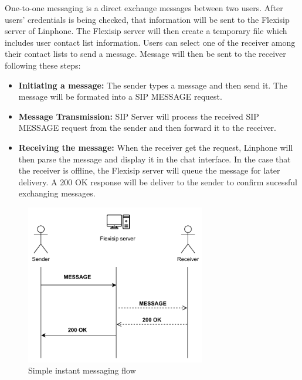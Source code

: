     \noindent One-to-one messaging is a direct exchange messages between two users. 
    After users' credentials is being checked, that information will be sent to the Flexisip server of Linphone. The Flexisip server will then create a temporary file which includes user contact list information.  
    Users can select one of the receiver among their contact lists to send a message. Message will then be sent to the receiver following these steps:

    \begin{itemize}
        \item \textbf {Initiating a message:} The sender types a message and then send it. The message will be formated into a SIP MESSAGE request. 
        \item \textbf {Message Transmission:} SIP Server will process the received SIP MESSAGE request from the sender and then forward it to the receiver.
        
        \pagebreak
        \item \textbf {Receiving the message:} When the receiver get the request, Linphone will then parse the message and display it in the chat interface.
        In the case that the receiver is offline, the Flexisip server will queue the message for later delivery. A 200 OK response will be deliver to the sender to confirm sucessful exchanging messages.
    \end{itemize}

    \begin{figure}[H]
        \centering
        \includegraphics[width=0.7\textwidth]{image/Instant messaging.pdf} 
        \caption{Simple instant messaging flow}
        \label{fig:instant_messaging}
    \end{figure}


    